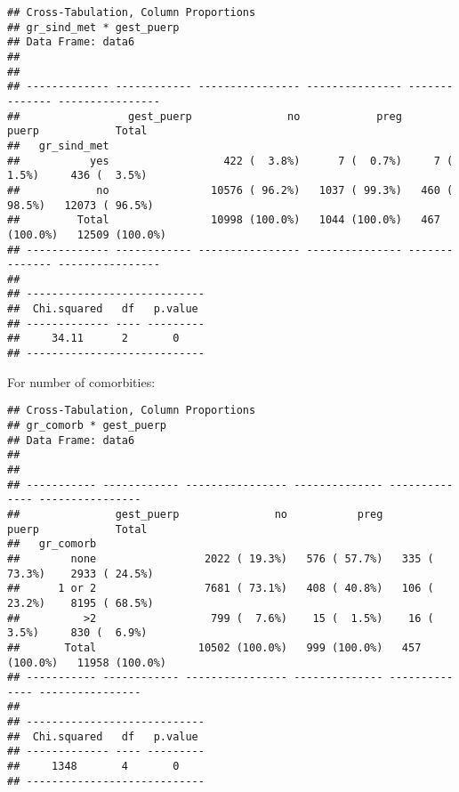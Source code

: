 \documentclass[
]{article}
\newenvironment{Shaded}{\begin{snugshade}}{\end{snugshade}}
\newcommand{\DataTypeTok}[1]{\textcolor[rgb]{0.13,0.29,0.53}{#1}}
\newcommand{\KeywordTok}[1]{\textcolor[rgb]{0.13,0.29,0.53}{\textbf{#1}}}
\newcommand{\NormalTok}[1]{#1}
\newcommand{\OperatorTok}[1]{\textcolor[rgb]{0.81,0.36,0.00}{\textbf{#1}}}
\newcommand{\OtherTok}[1]{\textcolor[rgb]{0.56,0.35,0.01}{#1}}
\newcommand{\StringTok}[1]{\textcolor[rgb]{0.31,0.60,0.02}{#1}}
\begin{document}
\begin{verbatim}
## Cross-Tabulation, Column Proportions  
## gr_sind_met * gest_puerp  
## Data Frame: data6  
## 
## 
## ------------- ------------ ---------------- --------------- -------------- ----------------
##                 gest_puerp               no            preg          puerp            Total
##   gr_sind_met                                                                              
##           yes                  422 (  3.8%)      7 (  0.7%)     7 (  1.5%)     436 (  3.5%)
##            no                10576 ( 96.2%)   1037 ( 99.3%)   460 ( 98.5%)   12073 ( 96.5%)
##         Total                10998 (100.0%)   1044 (100.0%)   467 (100.0%)   12509 (100.0%)
## ------------- ------------ ---------------- --------------- -------------- ----------------
## 
## ----------------------------
##  Chi.squared   df   p.value 
## ------------- ---- ---------
##     34.11      2       0    
## ----------------------------
\end{verbatim}

For number of comorbities:

\begin{Shaded}
\end{Shaded}

\begin{verbatim}
## Cross-Tabulation, Column Proportions  
## gr_comorb * gest_puerp  
## Data Frame: data6  
## 
## 
## ----------- ------------ ---------------- -------------- -------------- ----------------
##               gest_puerp               no           preg          puerp            Total
##   gr_comorb                                                                             
##        none                 2022 ( 19.3%)   576 ( 57.7%)   335 ( 73.3%)    2933 ( 24.5%)
##      1 or 2                 7681 ( 73.1%)   408 ( 40.8%)   106 ( 23.2%)    8195 ( 68.5%)
##          >2                  799 (  7.6%)    15 (  1.5%)    16 (  3.5%)     830 (  6.9%)
##       Total                10502 (100.0%)   999 (100.0%)   457 (100.0%)   11958 (100.0%)
## ----------- ------------ ---------------- -------------- -------------- ----------------
## 
## ----------------------------
##  Chi.squared   df   p.value 
## ------------- ---- ---------
##     1348       4       0    
## ----------------------------
\end{verbatim}
\end{document}
